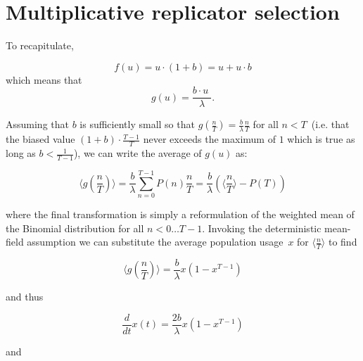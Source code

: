 \section{Multiplicative replicator selection}

To recapitulate,

$$f(u) = u\cdot(1+b) = u + u\cdot b$$
which means that
$$g(u) = \frac{b\cdot u\;}{\lambda}.$$

Assuming that $b$ is sufficiently small so that $g(\frac{n}{T})=\frac{b}{\lambda}\frac{n}{T}$ for all $n<T$~(i.e. that the biased value $(1+b)\cdot\frac{T-1}{T}$ never exceeds the maximum of $1$ which is true as long as $b<\frac{1}{T-1}$), we can write the average of $g(u)$ as:

$$\langle g(\frac{n}{T})\rangle=\frac{b}{\lambda}\sum_{n=0}^{T-1} P(n)\frac{n}{T}=\frac{b}{\lambda}(\langle\frac{n}{T}\rangle - P(T))$$

where the final transformation is simply a reformulation of the weighted mean of the Binomial distribution for all $n<0\ldots T-1$. Invoking the deterministic mean-field assumption we can substitute the average population usage~$x$ for $\langle\frac{n}{T}\rangle$ to find


$$\langle g(\frac{n}{T})\rangle=\frac{b}{\lambda}x(1-x^{T-1})$$

and thus

$$\frac{d}{dt}x(t)=\frac{2b}{\lambda}x(1-x^{T-1})$$

and

